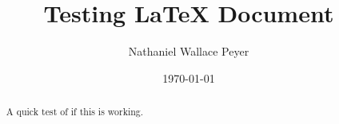\documentclass[12pt]{article}
\title{Testing LaTeX Document}
\author{ Nathaniel Wallace Peyer}
\date{\today}
\begin{document}
\maketitle

\begin{abstract}
    A quick test of if this is working.
\end{abstract}
\end{document}
